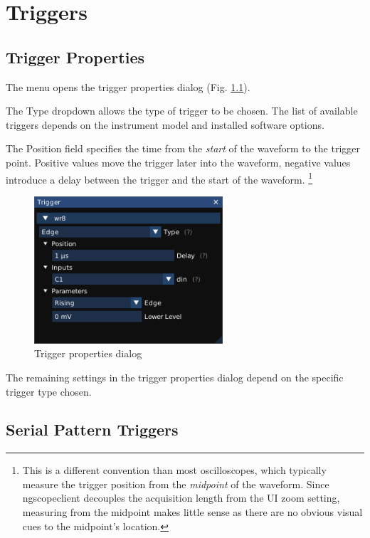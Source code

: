 \chapter{Triggers}

\section{Trigger Properties}

The  menu opens the trigger properties dialog (Fig. \ref{trigger-properties}).

The Type dropdown allows the type of trigger to be chosen. The list of available triggers depends on the instrument
model and installed software options.

The Position field specifies the time from the \emph{start} of the waveform to the trigger point. Positive values
move the trigger later into the waveform, negative values introduce a delay between the trigger and the start of the
waveform. \footnote{This is a different convention than most oscilloscopes, which typically measure the trigger
position from the \emph{midpoint} of the waveform. Since ngscopeclient decouples the acquisition length from the UI
zoom setting, measuring from the midpoint makes little sense as there are no obvious visual cues to the midpoint's
location.}

\begin{figure}[h]
\centering
\includegraphics[width=7cm]{ng-images/trigger-properties.png}
\caption{Trigger properties dialog}
\label{trigger-properties}
\end{figure}

The remaining settings in the trigger properties dialog depend on the specific trigger type chosen.

\section{Serial Pattern Triggers}


